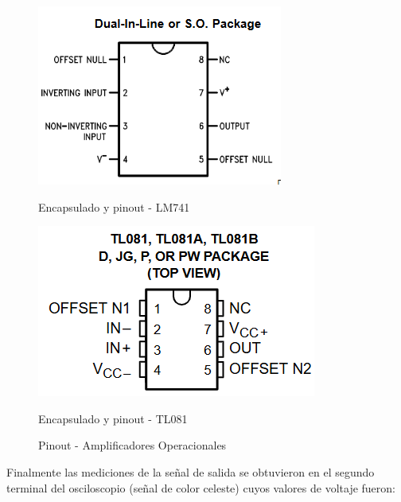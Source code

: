 \begin{figure}[h]
	\centering
	\begin{minipage}{0.4\linewidth}
		\centering	
		\includegraphics[width=\linewidth]{media/encapsulado-741}
		\caption{Encapsulado y pinout - LM741}
		\label{fig:encapsulado-741}	
	\end{minipage}
	\hfill
	\begin{minipage}{0.4\linewidth}
		\centering
		\includegraphics[width=\linewidth]{media/encapsulado-081}
		\caption{Encapsulado y pinout - TL081}
		\label{fig:encapsulado-081}
	\end{minipage}
	\caption{Pinout - Amplificadores Operacionales}
	\label{fig:integrados-opam}
\end{figure}

Finalmente las mediciones de la señal de salida se obtuvieron en el segundo terminal del osciloscopio (señal de color celeste) cuyos valores de voltaje fueron:

